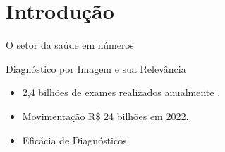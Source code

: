 \section{Introdução}





\begin{frame}{O setor da saúde em números}

    \begin{block}{Diagnóstico por Imagem e sua Relevância}
        \begin{itemize}
            \item 2,4 bilhões de exames realizados anualmente \cite{Abramed_2023}.
            \item Movimentação R\$ 24 bilhões em 2022.
            \item Eficácia de Diagnósticos.
        \end{itemize}
    \end{block}
    
    \vspace{3cm}

\end{frame}

